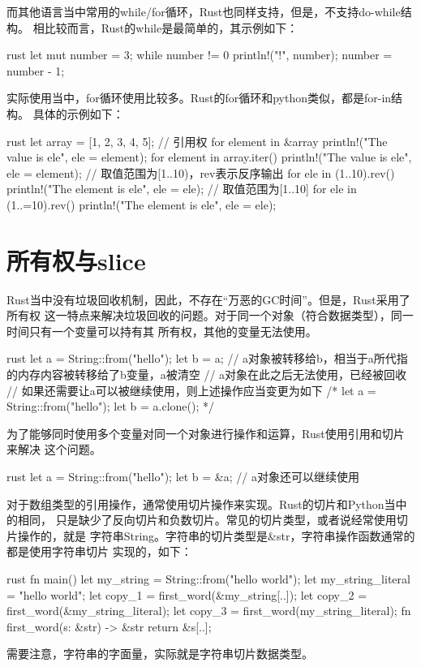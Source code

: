 而其他语言当中常用的while/for循环，Rust也同样支持，但是，不支持do-while结构。
相比较而言，Rust的while是最简单的，其示例如下：
\begin{code-block}{rust}
let mut number = 3;
while number != 0 {
    println!("{}!", number);
    number = number - 1;
}
\end{code-block}
实际使用当中，for循环使用比较多。Rust的for循环和python类似，都是for-in结构。
具体的示例如下：
\begin{code-block}{rust}
let array = [1, 2, 3, 4, 5];
// 引用权
for element in &array {
    println!("The value is {ele}", ele = element);
}
for element in array.iter() {
    println!("The value is {ele}", ele = element);
}
// 取值范围为[1..10)，rev表示反序输出
for ele in (1..10).rev() {
    println!("The element is {ele}", ele = ele);
}
// 取值范围为[1..10]
for ele in (1..=10).rev() {
    println!("The element is {ele}", ele = ele);
}
\end{code-block}

\section{所有权与slice}
Rust当中没有垃圾回收机制，因此，不存在“万恶的GC时间”。但是，Rust采用了所有权
这一特点来解决垃圾回收的问题。对于同一个对象（符合数据类型），同一时间只有一个变量可以持有其
所有权，其他的变量无法使用。
\begin{code-block}{rust}
let a = String::from("hello");
let b = a; // a对象被转移给b，相当于a所代指的内存内容被转移给了b变量，a被清空
// a对象在此之后无法使用，已经被回收
// 如果还需要让a可以被继续使用，则上述操作应当变更为如下
/*
let a = String::from("hello");
let b = a.clone();
*/
\end{code-block}
为了能够同时使用多个变量对同一个对象进行操作和运算，Rust使用引用和切片来解决
这个问题。
\begin{code-block}{rust}
let a = String::from("hello");
let b = &a;
// a对象还可以继续使用
\end{code-block}

对于数组类型的引用操作，通常使用切片操作来实现。Rust的切片和Python当中的相同，
只是缺少了反向切片和负数切片。常见的切片类型，或者说经常使用切片操作的，就是
字符串String。字符串的切片类型是\&str，字符串操作函数通常的都是使用字符串切片
实现的，如下：
\begin{code-block}{rust}
fn main() {
    let my_string = String::from("hello world");
    let my_string_literal = "hello world";
    let copy_1 = first_word(&my_string[..]);
    let copy_2 = first_word(&my_string_literal);
    let copy_3 = first_word(my_string_literal);
}
fn first_word(s: &str) -> &str {
    return &s[..];
}
\end{code-block}
需要注意，字符串的字面量，实际就是字符串切片数据类型。

